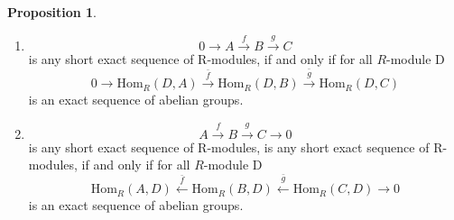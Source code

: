 \documentclass[a4paper,12pt]{article}
\newcommand{\rarr}[1]{\xrightarrow{#1}}
\newcommand{\larr}[1]{\xleftarrow{#1}}
\theoremstyle{definition}
\newtheorem{prop}[defn]{Proposition}
\begin{document}
\begin{prop}
    \quad \par
    \begin{enumerate}[(1)]
        \item $$0\rightarrow A \rarr{f} B \rarr{g} C$$ is any short exact sequence of R-modules, if and only if for all $R$-module D
              $$0 \rightarrow \text{Hom}_R (D,A) \rarr{\bar{f}} \text{Hom}_R (D,B) \rarr{\bar{g}} \text{Hom}_R (D,C) $$ is an exact sequence of abelian
              groups.
        \item $$A \rarr{f} B \rarr{g} C\rightarrow  0$$ is any short exact sequence of R-modules, is any short exact sequence of R-modules, if and only if for all $R$-module D
              $$\text{Hom}_R (A,D) \larr{\bar{f}} \text{Hom}_R (B,D) \larr{\bar{g}} \text{Hom}_R (C,D) \rightarrow 0$$ is an exact sequence of abelian
              groups.
    \end{enumerate}
\end{prop}
\end{document}
